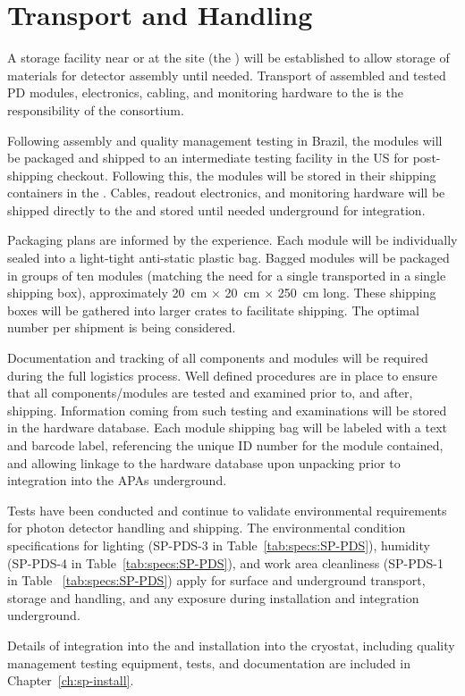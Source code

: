 \section{Transport and Handling}
\label{sec:fdsp-pd-install}

A storage facility near or at the  site (the ) will be established to allow storage of materials for detector assembly until needed.  Transport of assembled and tested PD modules, electronics, cabling, and monitoring hardware to the  is the responsibility of the  consortium.

Following assembly and quality management testing in Brazil, the  modules  will be packaged and shipped to an intermediate testing facility in the US for post-shipping checkout. Following this, the modules will be stored in their shipping containers in the .  Cables, readout electronics, and monitoring hardware will be shipped directly to the  and stored until needed underground for integration.

Packaging plans are informed by the  experience.  Each  module will be individually sealed into a light-tight anti-static plastic bag.  Bagged modules will be packaged in groups of ten modules (matching the need for a single  transported in a single shipping box), approximately \SI{20}{cm} $\times$ \SI{20}{cm} $\times$ \SI{250}{cm} long.  These shipping boxes will be gathered into larger crates to facilitate shipping.  The optimal number per shipment is being considered.

Documentation and tracking of all components and  modules will be required during the full logistics process. Well defined procedures are in place to ensure that all components/modules are tested and examined prior to, and after, shipping. Information coming from such testing and examinations will be stored in the  hardware database.  Each  module shipping bag will be labeled with a text and barcode label, referencing the unique ID number for the module contained, and allowing linkage to the hardware database upon unpacking prior to integration into the APAs underground.

Tests have been conducted and continue to validate environmental requirements for photon detector handling and shipping. The environmental condition specifications for lighting (SP-PDS-3 in Table~\ref{tab:specs:SP-PDS}), humidity (SP-PDS-4 in Table~\ref{tab:specs:SP-PDS}), and work area cleanliness (SP-PDS-1 in Table ~\ref{tab:specs:SP-PDS})
apply for surface and underground transport, storage and handling, and any exposure during installation and integration underground. 


Details of  integration into the  and installation into the cryostat, including quality management testing equipment, tests, and documentation are included in Chapter~\ref{ch:sp-install}. 

